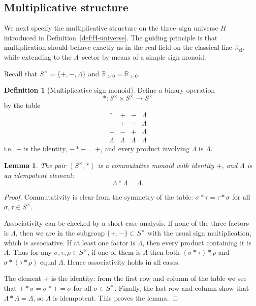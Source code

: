 \documentclass[11pt]{amsart}
\numberwithin{equation}{section}
\newtheorem{lemma}[theorem]{Lemma}
\theoremstyle{definition}
\newtheorem{definition}[theorem]{Definition}
\theoremstyle{remark}
\newcommand{\Rp}{\mathbb{R}_{>0}}
\newcommand{\Rc}{\mathbb{R}_{\mathrm{cl}}} %
\newcommand{\Hnum}{H}                      %
\newcommand{\Snon}{S^{\times}}             %
\begin{document}
\subsection{Multiplicative structure}
\label{subsec:multiplicative}

We next specify the multiplicative structure on the three--sign universe
$\Hnum$ introduced in Definition~\ref{def:H-universe}.  The guiding
principle is that multiplication should behave exactly as in the real
field on the classical line $\Rc$, while extending to the $\Lambda$--sector
by means of a simple sign monoid.

Recall that $\Snon=\{+,-,\Lambda\}$ and $\Rp=\Rp$.

\begin{definition}[Multiplicative sign monoid]\label{def:sign-monoid}
Define a binary operation
\[
  * : \Snon\times\Snon \longrightarrow \Snon
\]
by the table
\[
  \begin{array}{c|ccc}
  * & + & - & \Lambda\\\hline
  + & + & - & \Lambda\\
  - & - & + & \Lambda\\
  \Lambda & \Lambda & \Lambda & \Lambda
  \end{array}
\]
i.e.\ $+$ is the identity, $- * -=+$, and every product involving
$\Lambda$ is $\Lambda$.
\end{definition}

\begin{lemma}\label{lem:sign-monoid}
The pair $(\Snon,*)$ is a commutative monoid with identity $+$, and
$\Lambda$ is an idempotent element:
\[
  \Lambda*\Lambda=\Lambda.
\]
\end{lemma}

\begin{proof}
Commutativity is clear from the symmetry of the table:
$\sigma*\tau=\tau*\sigma$ for all $\sigma,\tau\in\Snon$.

Associativity can be checked by a short case analysis.  If none of the
three factors is $\Lambda$, then we are in the subgroup
$\{+,-\}\subset\Snon$ with the usual sign multiplication, which is
associative.  If at least one factor is $\Lambda$, then every product
containing it is $\Lambda$.  Thus for any $\sigma,\tau,\rho\in\Snon$,
if one of them is $\Lambda$ then both $(\sigma*\tau)*\rho$ and
$\sigma*(\tau*\rho)$ equal $\Lambda$.  Hence associativity holds in all
cases.

The element $+$ is the identity: from the first row and column of the
table we see that $+*\sigma=\sigma*+=\sigma$ for all
$\sigma\in\Snon$.  Finally, the last row and column show that
$\Lambda*\Lambda=\Lambda$, so $\Lambda$ is idempotent.  This proves the
lemma.
\end{proof}
\end{document}
